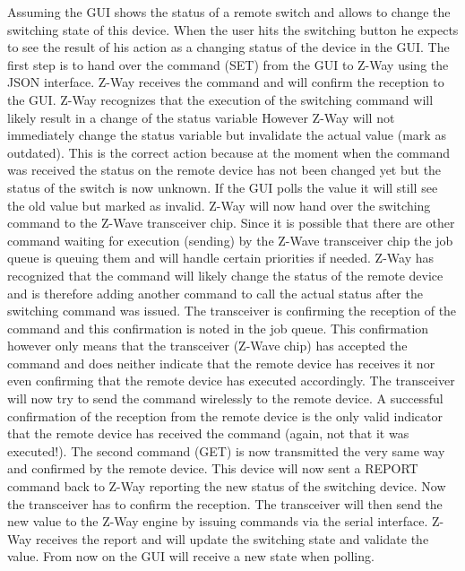 Assuming the GUI shows the status of a remote switch and allows to change the switching 
state of this device. When the user hits the switching button he expects to 
see the result of his action as a changing status of the device in the GUI. The first 
step is to hand over the command (SET)  from the GUI to Z-Way using the JSON interface.
Z-Way receives the command and will confirm the reception to the GUI. Z-Way recognizes 
that the execution of the switching command will likely result in a change 
of the status variable However Z-Way will not immediately change the status variable but 
invalidate the actual value (mark as outdated). This is the correct action because at the moment
when the command was received the status on the remote device has not been changed yet 
but the status of the switch is now unknown.
If the GUI polls the value it will still see the old value but marked as invalid.
Z-Way will now hand over the switching command to the Z-Wave transceiver chip. Since it 
is possible that there are other command waiting for execution (sending) by 
the Z-Wave transceiver chip the job queue is queuing them and will handle certain 
priorities if needed. Z-Way has recognized that the command will likely change the status
of the remote device and is therefore adding another command to call the actual status 
after the switching command was issued.
The transceiver is confirming the reception of the command and this confirmation is noted 
in the job queue. This confirmation however only means that the transceiver (Z-Wave chip)
has accepted the command and does neither indicate that the remote device has receives 
it nor even confirming that the remote device has executed accordingly.
The transceiver will now try to send the command wirelessly to the remote device. A 
successful confirmation of the reception from the remote device is the only valid 
indicator that the remote device has received the command (again, not that it was executed!).
The second command (GET) is now transmitted the very same way and confirmed by the remote 
device. This device will now sent a REPORT command back to Z-Way
reporting the new status of the switching device. Now the transceiver has to 
confirm the reception. The transceiver will then send the new value to the Z-Way 
engine by issuing commands via the serial interface. Z-Way receives the report and will 
update the switching state and validate the value.
From now on the GUI will receive a new state when polling.
